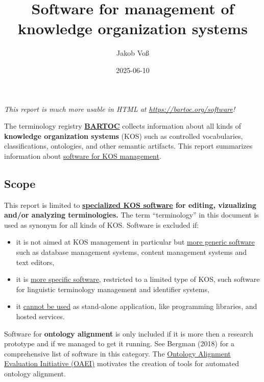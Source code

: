 \documentclass[
  DIV=10]{article}
\title{Software for management of knowledge organization systems}
\author{Jakob Voß}
\affil{%
                  Verbundzentrale des GBV (VZG)
              }
\date{2025-06-10}
\providecommand{\tightlist}{%
  \setlength{\itemsep}{0pt}\setlength{\parskip}{0pt}}
\begin{document}
\maketitle


\large

\emph{This report is much more usable in HTML at
\url{https://bartoc.org/software}!} \vspace*{20mm}

The terminology registry \textbf{\href{https://bartoc.org/}{BARTOC}}
collects information about all kinds of \textbf{knowledge organization
systems} (KOS) such as controlled vocabularies, classifications,
ontologies, and other semantic artifacts. This report summarizes
information about \hyperref[kos-software]{software for KOS management}.

\subsection{Scope}\label{scope}

This report is limited to \textbf{\hyperref[kos-software]{specialized
KOS software} for editing, vizualizing and/or analyzing terminologies.}
The term ``terminology'' in this document is used as synonym for all
kinds of KOS. Software is excluded if:

\begin{itemize}
\tightlist
\item
  it is not aimed at KOS management in particular but
  \hyperref[more-generic-software]{more generic software} such as
  database management systems, content management systems and text
  editors,
\item
  it is \hyperref[more-specific-software]{more specific software},
  restricted to a limited type of KOS, such software for linguistic
  terminology management and identifier systems,
\item
  it \hyperref[limited-use]{cannot be used} as stand-alone application,
  like programming libraries, and hosted services.
\end{itemize}

Software for \textbf{ontology alignment} is only included if it is more
then a research prototype and if we managed to get it running. See
Bergman (2018) for a comprehensive list of software in this category.
The \href{https://oaei.ontologymatching.org/}{Ontology Alignment
Evaluation Initiative (OAEI)} motivates the creation of tools for
automated ontology alignment.

\newpage
{}
\recalctypearea
\end{document}
